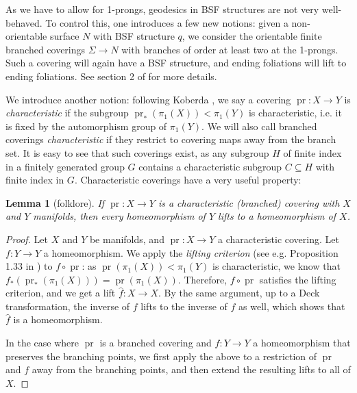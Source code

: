 \documentclass[a4paper]{article}
\newtheorem{lemma}[theorem]{Lemma}
\begin{document}
As we have to allow for 1-prongs, geodesics in BSF structures are not very well-behaved.
To control this, one introduces a few new notions:
given a non-orientable surface $N$ with BSF structure $q$, we consider the orientable finite branched coverings $\Sigma \rightarrow N$ with branches of order at least two at the 1-prongs.
Such a covering will again have a BSF structure, and ending foliations will lift to ending foliations.
See section 2 of \cite{BHW2} for more details.

We introduce another notion: 
following Koberda \cite{Koberda}, we say a covering $\operatorname{pr}\colon X\rightarrow Y$ is \emph{characteristic} if the subgroup $\operatorname{pr}_*(\pi_1(X)) < \pi_1(Y)$ is characteristic, i.e. it is fixed by the automorphism group of $\pi_1(Y)$.
We will also call branched coverings \emph{characteristic} if they restrict to covering maps away from the branch set.
It is easy to see that such coverings exist, as any subgroup $H$ of finite index in a finitely generated group $G$ contains a characteristic subgroup $C\subseteq H$ with finite index in $G$.
Characteristic coverings have a very useful property:

\begin{lemma}[folklore]\label{lem:char-covers-have-all-lifts}
If $\operatorname{pr}\colon X\rightarrow Y$ is a characteristic (branched) covering with $X$ and $Y$ manifolds, then every homeomorphism of $Y$ lifts to a homeomorphism of $X$.
\end{lemma}

\begin{proof}
Let $X$ and $Y$ be manifolds, and $\operatorname{pr}\colon X\rightarrow Y$ a characteristic covering.
Let $f\colon Y\rightarrow Y$ a homeomorphism.
We apply the \emph{lifting criterion} (see e.g. Proposition 1.33 in \cite{Hatcher}) to $f\circ \operatorname{pr}$:
as $\operatorname{pr}(\pi_1(X)) < \pi_1(Y)$ is characteristic, we know that $f_*(\operatorname{pr}_*(\pi_1(X))) = \operatorname{pr}(\pi_1(X))$.
Therefore, $f\circ \operatorname{pr}$ satisfies the lifting criterion, and we get a lift $\hat{f}\colon X\rightarrow X$.
By the same argument, up to a Deck transformation, the inverse of $f$ lifts to the inverse of $\hat f$ as well, which shows that $\hat{f}$ is a homeomorphism.

In the case where $\operatorname{pr}$ is a branched covering and $f\colon Y\rightarrow Y$ a homeomorphism that preserves the branching points, we first apply the above to a restriction of $\operatorname{pr}$ and $f$ away from the branching points, and then extend the resulting lifts to all of $X$.
\end{proof}
\end{document}
